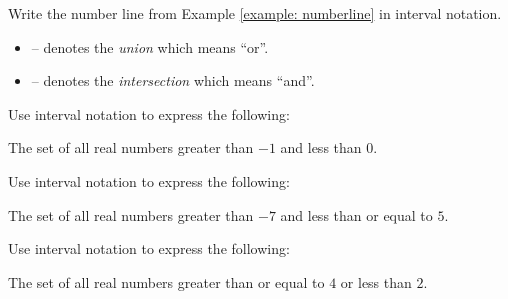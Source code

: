 \begin{exercise}
Write the number line from Example \ref{example: numberline} in
interval notation.
\end{exercise}
\begin{solution}[1in]

\end{solution}
\vspace{0.5em}

\begin{definition}
\text{}
\begin{itemize}
    \item \blank{$\cup$}{$\cup$} -- denotes the \emph{union} which means ``or''.
    \item \blank{$\cap$}{$\cap$} -- denotes the \emph{intersection} which means ``and''.
\end{itemize}
\end{definition}

\newpage

\begin{exercise}
Use interval notation to express the following:

The set of all real numbers greater than $-1$ and less than $0$.
\end{exercise}
\begin{solution}[2in]

\end{solution}
\vspace{0.5em}

\begin{exercise}
Use interval notation to express the following:

The set of all real numbers greater than $-7$ and less than or equal
to $5$.
\end{exercise}
\begin{solution}[2in]

\end{solution}
\vspace{0.5em}

\begin{exercise}
Use interval notation to express the following:

The set of all real numbers greater than or equal to $4$
or less than $2$.
\end{exercise}
\begin{solution}[2in]

\end{solution}
\vspace{0.5em}

